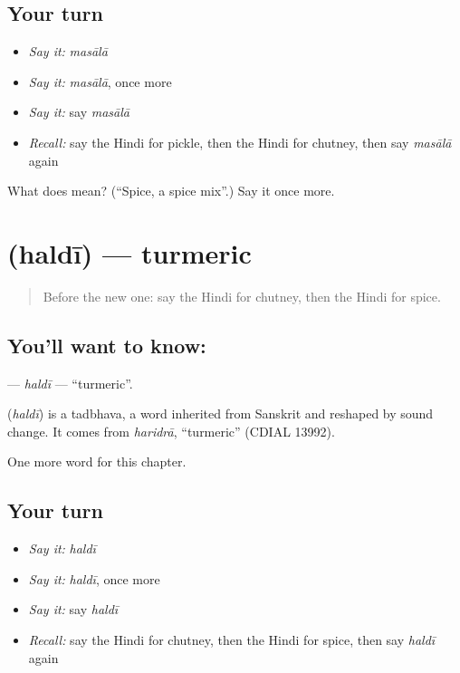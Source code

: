 \subsection*{Your turn}
\begin{itemize}
\raggedright
  \item \emph{Say it:} \emph{masālā}
  \item \emph{Say it:} \emph{masālā}, once more
  \item \emph{Say it:} say \emph{masālā}
  \item \emph{Recall:} say the Hindi for pickle, then the Hindi for chutney, then say \emph{masālā} again
\end{itemize}

\begin{tcolorbox}[breakable,colback=teal!4,colframe=teal!35!black,title={Before you move on}]
What does  mean? (\textquotedblleft{}Spice, a spice mix\textquotedblright{}.) Say it once more.
\end{tcolorbox}
\section[\texorpdfstring{\hi{हल्दी} (haldī)}{हल्दी (haldī)}]{ (haldī) — turmeric}

\label{lesson:HI-C211-haldi}



\begin{quote}
Before the new one: say the Hindi for chutney, then the Hindi for spice.
\end{quote}

\subsection*{You'll want to know: }
\textbf{} — \emph{haldī} — \textquotedblleft{}turmeric\textquotedblright{}.

\begin{cousinweb}
\textbf{} (\emph{haldī}) is a tadbhava, a word inherited from Sanskrit and reshaped by sound change. It comes from \emph{haridrā}, \textquotedblleft{}turmeric\textquotedblright{} (CDIAL 13992).
\end{cousinweb}

\begin{grammarlens}[title={What you've built}]
One more word for this chapter.
\end{grammarlens}

\subsection*{Your turn}
\begin{itemize}
\raggedright
  \item \emph{Say it:} \emph{haldī}
  \item \emph{Say it:} \emph{haldī}, once more
  \item \emph{Say it:} say \emph{haldī}
  \item \emph{Recall:} say the Hindi for chutney, then the Hindi for spice, then say \emph{haldī} again
\end{itemize}

